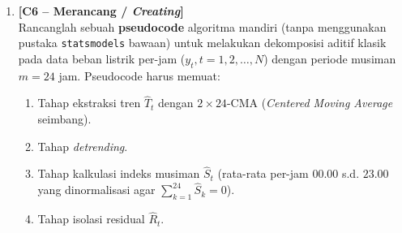 \documentclass[11pt,a4paper]{article}
\begin{document}
\begin{enumerate}[leftmargin=1.8em, label=\textbf{Soal \arabic*.}]
    \item \textbf{[C6 -- Merancang / \textit{Creating}]} \\
    Rancanglah sebuah \textbf{pseudocode} algoritma mandiri (tanpa menggunakan pustaka \texttt{statsmodels} bawaan) untuk melakukan dekomposisi aditif klasik pada data beban listrik per-jam ($y_t, t=1,2,\dots,N$) dengan periode musiman $m=24$ jam. Pseudocode harus memuat:
    \begin{enumerate}[label=\alph*.]
        \item Tahap ekstraksi tren $\hat{T}_t$ dengan $2 \times 24$-CMA (\textit{Centered Moving Average} seimbang).
        \item Tahap \textit{detrending}.
        \item Tahap kalkulasi indeks musiman $\hat{S}_t$ (rata-rata per-jam $00.00$ s.d. $23.00$ yang dinormalisasi agar $\sum_{k=1}^{24} \hat{S}_k = 0$).
        \item Tahap isolasi residual $\hat{R}_t$.
    \end{enumerate}
    \vspace{4.5cm}

\end{enumerate}
\end{document}
